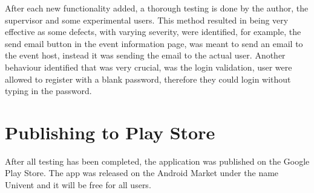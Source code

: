 After each new functionality added, a thorough testing is done by the author, the supervisor and some experimental users. 
This method resulted in being very effective as some defects, with varying severity, were identified, for example, the send email button in the event information page, was meant to send an email to the event host, instead it was sending the email to the actual user. 
Another behaviour identified that was very crucial, was the login validation, user were allowed to register with a blank password, therefore they could login  without typing in the password. 

\section{Publishing to Play Store}
After all testing has been completed, the application was
published on the Google Play Store. 
The app was released on the Android Market under the name Univent and it will be free for all users. 